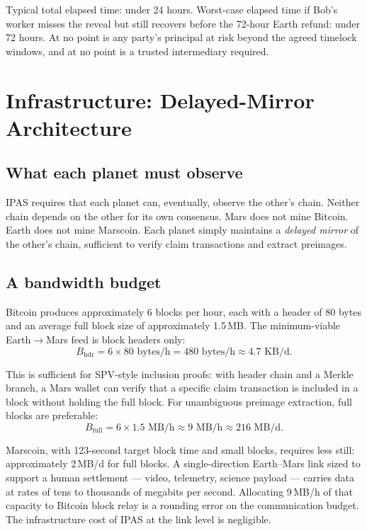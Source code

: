 \documentclass[11pt]{article}
\begin{document}
Typical total elapsed time: under 24 hours. Worst-case elapsed time if Bob's worker misses the reveal but still recovers before the 72-hour Earth refund: under 72 hours. At no point is any party's principal at risk beyond the agreed timelock windows, and at no point is a trusted intermediary required.

\section{Infrastructure: Delayed-Mirror Architecture}
\label{sec:infra}

\subsection{What each planet must observe}

IPAS requires that each planet can, eventually, observe the other's chain. Neither chain depends on the other for its own consensus. Mars does not mine Bitcoin. Earth does not mine Marscoin. Each planet simply maintains a \emph{delayed mirror} of the other's chain, sufficient to verify claim transactions and extract preimages.

\subsection{A bandwidth budget}

Bitcoin produces approximately 6 blocks per hour, each with a header of 80 bytes and an average full block size of approximately 1.5\,MB. The minimum-viable Earth$\to$Mars feed is block headers only:
\begin{equation}
B_{\text{hdr}} = 6 \times 80 \text{ bytes/h} = 480 \text{ bytes/h} \approx 4.7 \text{ KB/d}.
\end{equation}

This is sufficient for SPV-style inclusion proofs: with header chain and a Merkle branch, a Mars wallet can verify that a specific claim transaction is included in a block without holding the full block. For unambiguous preimage extraction, full blocks are preferable:
\begin{equation}
B_{\text{full}} = 6 \times 1.5 \text{ MB/h} \approx 9 \text{ MB/h} \approx 216 \text{ MB/d}.
\end{equation}

Marscoin, with 123-second target block time and small blocks, requires less still: approximately 2\,MB/d for full blocks. A single-direction Earth--Mars link sized to support a human settlement --- video, telemetry, science payload --- carries data at rates of tens to thousands of megabits per second. Allocating 9\,MB/h of that capacity to Bitcoin block relay is a rounding error on the communication budget. The infrastructure cost of IPAS at the link level is negligible.
\end{document}
